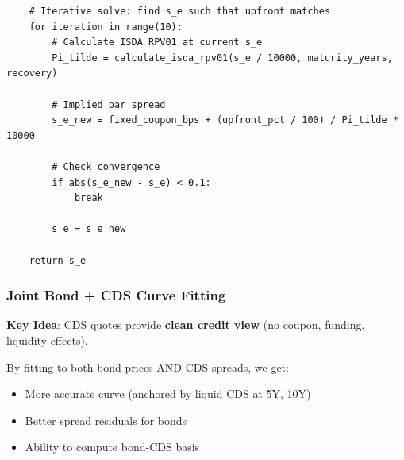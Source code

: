 \documentclass[11pt,a4paper]{article}
\begin{document}
\begin{implbox}
\begin{lstlisting}
    # Iterative solve: find s_e such that upfront matches
    for iteration in range(10):
        # Calculate ISDA RPV01 at current s_e
        Pi_tilde = calculate_isda_rpv01(s_e / 10000, maturity_years, recovery)
        
        # Implied par spread
        s_e_new = fixed_coupon_bps + (upfront_pct / 100) / Pi_tilde * 10000
        
        # Check convergence
        if abs(s_e_new - s_e) < 0.1:
            break
        
        s_e = s_e_new
    
    return s_e
\end{lstlisting}
\end{implbox}

\subsubsection{Joint Bond + CDS Curve Fitting}

\begin{warnbox}
\textbf{Key Idea}: CDS quotes provide \textbf{clean credit view} (no coupon, funding, liquidity effects).

By fitting to both bond prices AND CDS spreads, we get:
\begin{itemize}
    \item More accurate curve (anchored by liquid CDS at 5Y, 10Y)
    \item Better spread residuals for bonds
    \item Ability to compute bond-CDS basis
\end{itemize}
\end{warnbox}
\end{document}
